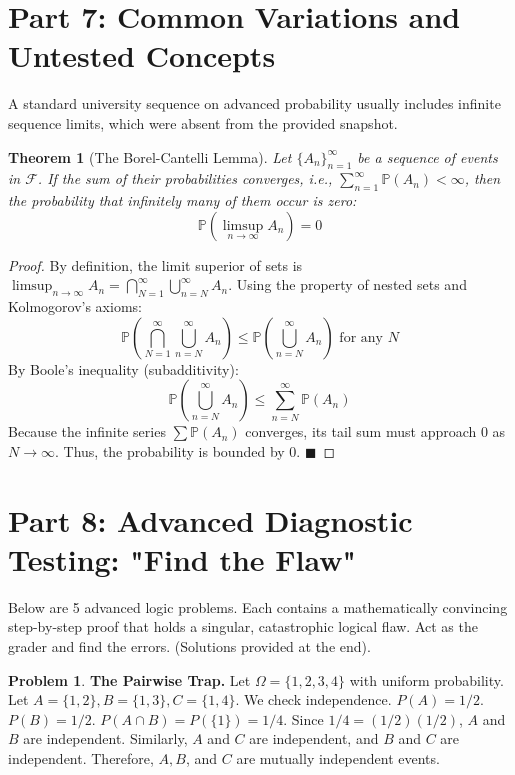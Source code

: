 \documentclass[11pt, letterpaper]{article}
\newtheorem{theorem}{Theorem}[section]
\theoremstyle{definition}
\newtheorem{problem}{Problem}
\begin{document}
\newpage
\section{Part 7: Common Variations and Untested Concepts}

A standard university sequence on advanced probability usually includes infinite sequence limits, which were absent from the provided snapshot. 

\begin{theorem}[The Borel-Cantelli Lemma]
Let $\{A_n\}_{n=1}^\infty$ be a sequence of events in $\mathscr{F}$. If the sum of their probabilities converges, i.e., $\sum_{n=1}^\infty \mathbb{P}(A_n) < \infty$, then the probability that infinitely many of them occur is zero:
\[ \mathbb{P} \left( \limsup_{n \to \infty} A_n \right) = 0 \]
\end{theorem}
\begin{proof}
By definition, the limit superior of sets is $\limsup_{n \to \infty} A_n = \bigcap_{N=1}^\infty \bigcup_{n=N}^\infty A_n$.
Using the property of nested sets and Kolmogorov's axioms:
\[ \mathbb{P} \left( \bigcap_{N=1}^\infty \bigcup_{n=N}^\infty A_n \right) \leq \mathbb{P} \left( \bigcup_{n=N}^\infty A_n \right) \text{ for any } N \]
By Boole's inequality (subadditivity):
\[ \mathbb{P} \left( \bigcup_{n=N}^\infty A_n \right) \leq \sum_{n=N}^\infty \mathbb{P}(A_n) \]
Because the infinite series $\sum \mathbb{P}(A_n)$ converges, its tail sum must approach $0$ as $N \to \infty$. Thus, the probability is bounded by $0$. $\blacksquare$
\end{proof}

\section{Part 8: Advanced Diagnostic Testing: "Find the Flaw"}

Below are 5 advanced logic problems. Each contains a mathematically convincing step-by-step proof that holds a singular, catastrophic logical flaw. Act as the grader and find the errors. (Solutions provided at the end).

\begin{problem}
\textbf{The Pairwise Trap.}
Let $\Omega = \{1, 2, 3, 4\}$ with uniform probability. Let $A = \{1,2\}, B = \{1,3\}, C = \{1,4\}$. We check independence. $P(A) = 1/2$. $P(B) = 1/2$. $P(A \cap B) = P(\{1\}) = 1/4$. Since $1/4 = (1/2)(1/2)$, $A$ and $B$ are independent. Similarly, $A$ and $C$ are independent, and $B$ and $C$ are independent. Therefore, $A, B$, and $C$ are mutually independent events.
\end{problem}
\end{document}
